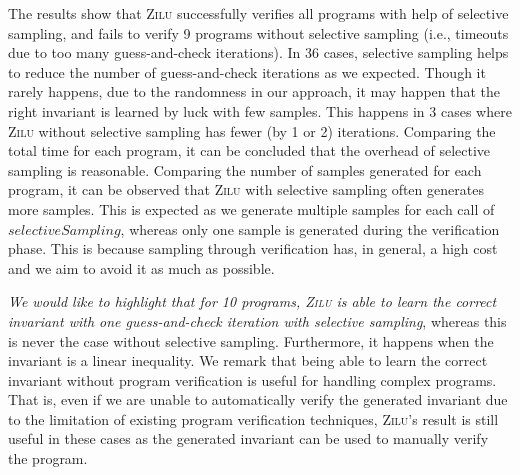 The results show that \textsc{Zilu} successfully verifies all programs with help of selective sampling, and fails to verify 9 programs without selective sampling (i.e., timeouts due to too many guess-and-check iterations). In 36 cases, selective sampling helps to reduce the number of guess-and-check iterations as we expected. Though it rarely happens, due to the randomness in our approach, it may happen that the right invariant is learned by luck with few samples. This happens in 3 cases where \textsc{Zilu} without selective sampling has fewer (by 1 or 2) iterations. Comparing the total time for each program, it can be concluded that the overhead of selective sampling is reasonable. Comparing the number of samples generated for each program, it can be observed that \textsc{Zilu} with selective sampling often generates more samples. This is expected as we generate multiple samples for each call of $selectiveSampling$, whereas only one sample is generated during the verification phase. This is because sampling through verification has, in general, a high cost and we aim to avoid it as much as possible.
%

\emph{We would like to highlight that for 10 programs, \textsc{Zilu} is able to learn the correct invariant with one guess-and-check iteration with selective sampling}, whereas this is never the case without selective sampling. Furthermore, it happens when the invariant is a linear inequality. We remark that being able to learn the correct invariant without program verification is useful for handling complex programs. That is, even if we are unable to automatically verify the generated invariant due to the limitation of existing program verification techniques, \textsc{Zilu}'s result is still useful in these cases as the generated invariant can be used to manually verify the program.

